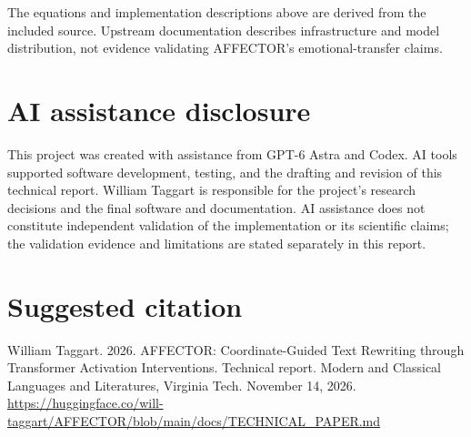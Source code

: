 \documentclass[manuscript,screen,nonacm]{acmart}
\begin{document}
The equations and implementation descriptions above are derived from the
included source. Upstream documentation describes infrastructure and
model distribution, not evidence validating AFFECTOR's
emotional-transfer claims.

\section*{AI assistance disclosure}
This project was created with assistance from GPT-6 Astra and Codex. AI
tools supported software development, testing, and the drafting and
revision of this technical report. William Taggart is responsible for
the project's research decisions and the final software and
documentation. AI assistance does not constitute independent validation
of the implementation or its scientific claims; the validation evidence
and limitations are stated separately in this report.




\section*{Suggested citation}
William Taggart. 2026. AFFECTOR: Coordinate-Guided Text Rewriting
through Transformer Activation Interventions. Technical report. Modern
and Classical Languages and Literatures, Virginia Tech. November 14, 2026.
\url{https://huggingface.co/will-taggart/AFFECTOR/blob/main/docs/TECHNICAL_PAPER.md}
\end{document}
